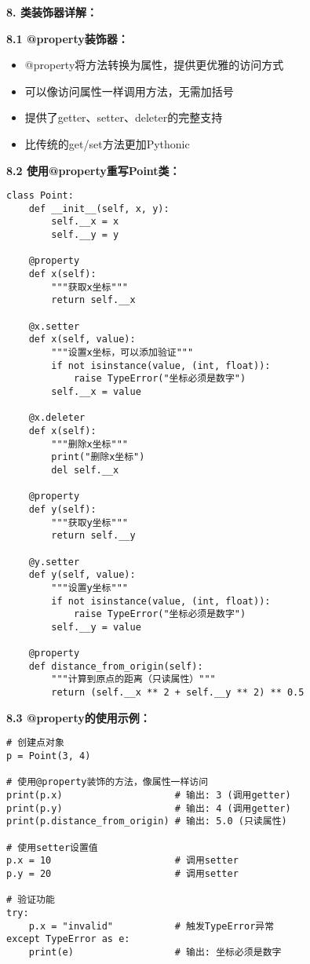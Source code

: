 \begin{mdframed}
  \textbf{8. 类装饰器详解：}

  \textbf{8.1 @property装饰器：}
  \begin{itemize}
    \item @property将方法转换为属性，提供更优雅的访问方式
    \item 可以像访问属性一样调用方法，无需加括号
    \item 提供了getter、setter、deleter的完整支持
    \item 比传统的get/set方法更加Pythonic
  \end{itemize}

  \textbf{8.2 使用@property重写Point类：}
  \begin{lstlisting}
class Point:
    def __init__(self, x, y):
        self.__x = x
        self.__y = y

    @property
    def x(self):
        """获取x坐标"""
        return self.__x

    @x.setter
    def x(self, value):
        """设置x坐标，可以添加验证"""
        if not isinstance(value, (int, float)):
            raise TypeError("坐标必须是数字")
        self.__x = value

    @x.deleter
    def x(self):
        """删除x坐标"""
        print("删除x坐标")
        del self.__x

    @property
    def y(self):
        """获取y坐标"""
        return self.__y

    @y.setter
    def y(self, value):
        """设置y坐标"""
        if not isinstance(value, (int, float)):
            raise TypeError("坐标必须是数字")
        self.__y = value

    @property
    def distance_from_origin(self):
        """计算到原点的距离（只读属性）"""
        return (self.__x ** 2 + self.__y ** 2) ** 0.5
  \end{lstlisting}

  \textbf{8.3 @property的使用示例：}
  \begin{lstlisting}
# 创建点对象
p = Point(3, 4)

# 使用@property装饰的方法，像属性一样访问
print(p.x)                    # 输出: 3 (调用getter)
print(p.y)                    # 输出: 4 (调用getter)
print(p.distance_from_origin) # 输出: 5.0 (只读属性)

# 使用setter设置值
p.x = 10                      # 调用setter
p.y = 20                      # 调用setter

# 验证功能
try:
    p.x = "invalid"           # 触发TypeError异常
except TypeError as e:
    print(e)                  # 输出: 坐标必须是数字


\end{lstlisting}
\end{mdframed}
